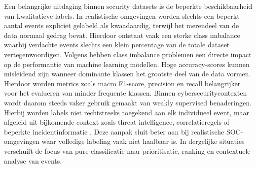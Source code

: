 Een belangrijke uitdaging binnen security datasets is de beperkte beschikbaarheid van kwalitatieve labels. In realistische omgevingen worden slechts een beperkt aantal events expliciet gelabeld als kwaadaardig, terwijl het merendeel van de data normaal gedrag bevat. Hierdoor ontstaat vaak een sterke class imbalance waarbij verdachte events slechts een klein percentage van de totale dataset vertegenwoordigen.
\newline
\newline
Volgens \textcite{Krawczyk2016} hebben class imbalance problemen een directe impact op de performantie van machine learning modellen. Hoge accuracy-scores kunnen misleidend zijn wanneer dominante klassen het grootste deel van de data vormen. Hierdoor worden metrics zoals macro F1-score, precision en recall belangrijker voor het evalueren van minder frequente klassen.
\newline
\newline
Binnen cybersecuritycontexten wordt daarom steeds vaker gebruik gemaakt van weakly supervised benaderingen. Hierbij worden labels niet rechtstreeks toegekend aan elk individueel event, maar afgeleid uit bijkomende context zoals threat intelligence, correlatieregels of beperkte incidentinformatie \autocite{Zhou2018WeakSupervision}.
\newline
\newline
Deze aanpak sluit beter aan bij realistische SOC-omgevingen waar volledige labeling vaak niet haalbaar is. In dergelijke situaties verschuift de focus van pure classificatie naar prioritisatie, ranking en contextuele analyse van events.

